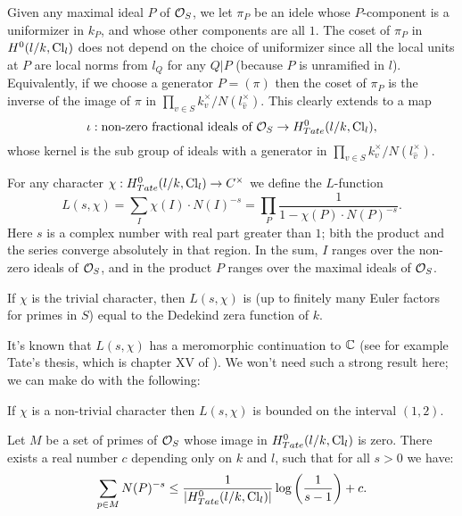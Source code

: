 Given any maximal ideal $P$ of ${\mathcal O}_S$, we let $\pi_P$ be an idele whose
$P$-component is a uniformizer in $k_P$, and whose other components are all $1$.
The coset of $\pi_P$ in $H^0(l/k,\mathrm{Cl}_l)$ does not depend on the choice of uniformizer since
all the local units at $P$ are local norms from $l_{Q}$ for any $Q|P$
(because $P$ is unramified in $l$).
Equivalently, if we choose a generator $P=(\pi)$ then the coset of $\pi_P$ is the inverse of
the image of $\pi$ in $\prod_{v \in S} k_v^\times / N(l_{\hat v}^\times)$.
This clearly extends to a map
\[
	\iota : \textrm{non-zero fractional ideals of ${\mathcal O}_S$}
	\to
	H^0_{Tate}(l/k,\mathrm{Cl}_l),
\]
whose kernel is the sub group of ideals with a generator in
$\prod_{v \in S} k_v^\times / N(l_{\hat v}^\times)$.

\begin{definition}
	For any character $\chi : H^0_{Tate}(l/k,\mathrm{Cl}_l) \to C^\times$ we define the $L$-function
	\[
		L(s,\chi)
		=
		\sum_{I} \chi(I) \cdot N(I)^{-s}
		=
		\prod_{P} \frac{1}{1-\chi(P) \cdot N(P)^{-s}}.
	\]
	Here $s$ is a complex number with real part greater than $1$; bith the product and the series
	converge absolutely in that region.
	In the sum, $I$ ranges over the non-zero ideals of ${\mathcal O}_S$, and in the product $P$
	ranges over the maximal ideals of ${\mathcal O}_S$.

	If $\chi$ is the trivial character, then $L(s,\chi)$ is
	(up to finitely many Euler factors for primes in $S$)
	equal to the Dedekind zera function of $k$.
\end{definition}


It's known that $L(s,\chi)$ has a meromorphic continuation to ${\mathbb C}$
(see for example Tate's thesis, which is chapter XV of \cite{cassells frohlich}).
We won't need such a strong result here; we can make do with the following:

\begin{lemma}
	If $\chi$ is a non-trivial character then $L(s,\chi)$ is
	bounded on the interval $(1,2)$.
\end{lemma}



\begin{lemma}
	Let $M$ be a set of primes of ${\mathcal O}_S$ whose image in $H^0_{Tate}(l/k,\mathrm{Cl}_l)$ is zero.
	There exists a real number $c$ depending only on $k$ and $l$,
	such that for all $s > 0$ we have:
	\[
		\sum_{p \in M} N(P)^{-s}
		\le \frac{1}{|H^0_{Tate}(l/k,\mathrm{Cl}_l)|} \log\left(\frac{1}{s-1}\right) + c.
	\]
\end{lemma}


